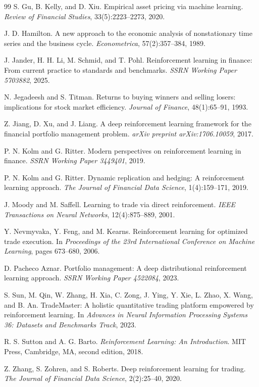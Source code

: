 \documentclass[11pt]{article}
\begin{document}
\begin{thebibliography}{99}
S. Gu, B. Kelly, and D. Xiu.
\newblock Empirical asset pricing via machine learning.
\newblock \emph{Review of Financial Studies}, 33(5):2223--2273, 2020.

J. D. Hamilton.
\newblock A new approach to the economic analysis of nonstationary time series
  and the business cycle.
\newblock \emph{Econometrica}, 57(2):357--384, 1989.

J. Jander, H. H. Li, M. Schmid, and T. Pohl.
\newblock Reinforcement learning in finance: From current practice to standards
  and benchmarks.
\newblock \emph{SSRN Working Paper 5703882}, 2025.

N. Jegadeesh and S. Titman.
\newblock Returns to buying winners and selling losers: implications for stock
  market efficiency.
\newblock \emph{Journal of Finance}, 48(1):65--91, 1993.

Z. Jiang, D. Xu, and J. Liang.
\newblock A deep reinforcement learning framework for the financial portfolio
  management problem.
\newblock \emph{arXiv preprint arXiv:1706.10059}, 2017.

P. N. Kolm and G. Ritter.
\newblock Modern perspectives on reinforcement learning in finance.
\newblock \emph{SSRN Working Paper 3449401}, 2019.

P. N. Kolm and G. Ritter.
\newblock Dynamic replication and hedging: A reinforcement learning approach.
\newblock \emph{The Journal of Financial Data Science}, 1(4):159--171, 2019.

J. Moody and M. Saffell.
\newblock Learning to trade via direct reinforcement.
\newblock \emph{IEEE Transactions on Neural Networks}, 12(4):875--889, 2001.

Y. Nevmyvaka, Y. Feng, and M. Kearns.
\newblock Reinforcement learning for optimized trade execution.
\newblock In \emph{Proceedings of the 23rd International Conference on Machine
  Learning}, pages 673--680, 2006.

D. Pacheco Aznar.
\newblock Portfolio management: A deep distributional reinforcement learning
  approach.
\newblock \emph{SSRN Working Paper 4522084}, 2023.

S. Sun, M. Qin, W. Zhang, H. Xia, C. Zong, J. Ying, Y. Xie, L. Zhao,
  X. Wang, and B. An.
\newblock TradeMaster: A holistic quantitative trading platform empowered by
  reinforcement learning.
\newblock In \emph{Advances in Neural Information Processing Systems 36:
  Datasets and Benchmarks Track}, 2023.

R. S. Sutton and A. G. Barto.
\newblock \emph{Reinforcement Learning: An Introduction}.
\newblock MIT Press, Cambridge, MA, second edition, 2018.

Z. Zhang, S. Zohren, and S. Roberts.
\newblock Deep reinforcement learning for trading.
\newblock \emph{The Journal of Financial Data Science}, 2(2):25--40, 2020.

\end{thebibliography}
\end{document}

